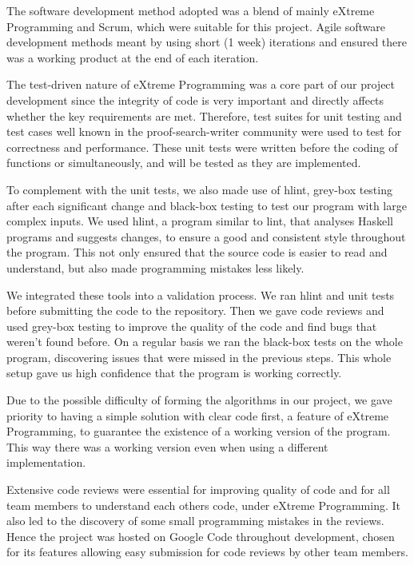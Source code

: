 The software development method adopted was a blend of mainly eXtreme Programming and Scrum, which were suitable for this project. Agile software development methods meant by using short (1 week) iterations and ensured there was a working product at the end of each iteration.

The test-driven nature of eXtreme Programming was a core part of our project development since the integrity of code is very important and directly affects whether the key requirements are met. Therefore, test suites for unit testing and test cases well known in the proof-search-writer community were used to test for correctness and performance. These unit tests were written before the coding of functions or simultaneously, and will be tested as they are implemented.

To complement with the unit tests, we also made use of hlint, grey-box testing after each significant change and black-box testing to test our program with large complex inputs. We used hlint, a program similar to lint, that analyses Haskell programs and suggests changes, to ensure a good and consistent style throughout the program. This not only ensured that the source code is easier to read and understand, but also made programming mistakes less likely.

We integrated these tools into a validation process. We ran hlint and unit tests before submitting the code to the repository. Then we gave code reviews and used grey-box testing to improve the quality of the code and find bugs that weren't found before. On a regular basis we ran the black-box tests on the whole program, discovering issues that were missed in the previous steps. This whole setup gave us high confidence that the program is working correctly.

Due to the possible difficulty of forming the algorithms in our project, we gave priority to having a simple solution with clear code first, a feature of eXtreme Programming, to guarantee the existence of a working version of the program. This way there was a working version even when using a different implementation.

Extensive code reviews were essential for improving quality of code and for all team members to understand each others code, under eXtreme Programming. It also led to the discovery of some small programming mistakes in the reviews. Hence the project was hosted on Google Code throughout development, chosen for its features allowing easy submission for code reviews by other team members.


